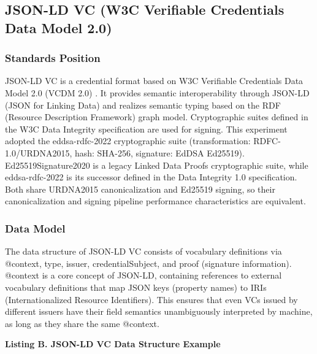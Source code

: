 \documentclass[conference]{IEEEtran}
\begin{document}
\subsection{JSON-LD VC (W3C Verifiable Credentials Data Model 2.0)}

\subsubsection{Standards Position}

JSON-LD VC is a credential format based on W3C Verifiable Credentials Data Model 2.0 (VCDM 2.0) \cite{ref2}. It provides semantic interoperability through JSON-LD (JSON for Linking Data) and realizes semantic typing based on the RDF (Resource Description Framework) graph model. Cryptographic suites defined in the W3C Data Integrity specification \cite{ref10} are used for signing. This experiment adopted the eddsa-rdfc-2022 cryptographic suite (transformation: RDFC-1.0/URDNA2015, hash: SHA-256, signature: EdDSA Ed25519). Ed25519Signature2020 is a legacy Linked Data Proofs cryptographic suite, while eddsa-rdfc-2022 is its successor defined in the Data Integrity 1.0 specification. Both share URDNA2015 canonicalization and Ed25519 signing, so their canonicalization and signing pipeline performance characteristics are equivalent.

\subsubsection{Data Model}

The data structure of JSON-LD VC consists of vocabulary definitions via @context, type, issuer, credentialSubject, and proof (signature information). @context is a core concept of JSON-LD, containing references to external vocabulary definitions that map JSON keys (property names) to IRIs (Internationalized Resource Identifiers). This ensures that even VCs issued by different issuers have their field semantics unambiguously interpreted by machine, as long as they share the same @context.

\textbf{Listing B. JSON-LD VC Data Structure Example}
\end{document}
